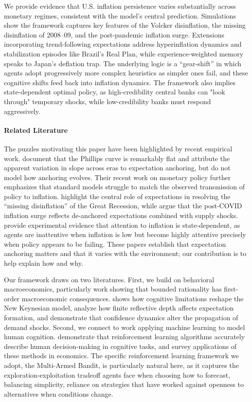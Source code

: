 \documentclass[10pt]{article}
\begin{document}
We provide evidence that U.S. inflation persistence varies substantially across monetary regimes, consistent with the model's central prediction. Simulations show the framework captures key features of the Volcker disinflation, the missing disinflation of 2008–09, and the post-pandemic inflation surge. Extensions incorporating trend-following expectations address hyperinflation dynamics and stabilization episodes like Brazil's Real Plan, while experience-weighted memory speaks to Japan's deflation trap. The underlying logic is a ``gear-shift'' in which agents adopt progressively more complex heuristics as simpler ones fail, and these cognitive shifts feed back into inflation dynamics. The framework also implies state-dependent optimal policy, as high-credibility central banks can "look through" temporary shocks, while low-credibility banks must respond aggressively.

\paragraph{Related Literature} The puzzles motivating this paper have been highlighted by recent empirical work. \citet{hazell2022slope} document that the Phillips curve is remarkably flat and attribute the apparent variation in slope across eras to expectation anchoring, but do not model how anchoring evolves. Their recent work on monetary policy \citep{nakamura2025taylor} further emphasizes that standard models struggle to match the observed transmission of policy to inflation. \citet{coibion2015} highlight the central role of expectations in resolving the ``missing disinflation'' of the Great Recession, while \citet{coibion2025inflation} argue that the post-COVID inflation surge reflects de-anchored expectations combined with supply shocks. \citet{weber2025} provide experimental evidence that attention to inflation is state-dependent, as agents are inattentive when inflation is low but become highly attentive precisely when policy appears to be failing. These papers establish that expectation anchoring matters and that it varies with the environment; our contribution is to help explain how and why.

Our framework draws on two literatures. First, we build on behavioral macroeconomics, particularly work showing that bounded rationality has first-order macroeconomic consequences. \citet{gabaix2020} shows how cognitive limitations reshape the New Keynesian model, \citet{garciaschmidt2019} analyze how finite reflective depth affects expectation formation, and \citet{angeletos2023confidence} demonstrate that confidence dynamics alter the propagation of demand shocks. Second, we connect to work applying machine learning to model human cognition. \citet{binz2023} demonstrate that reinforcement learning algorithms accurately describe human decision-making in cognitive tasks, and \citet{charpentier2021} survey applications of these methods in economics. The specific reinforcement learning framework we adopt, the Multi-Armed Bandit, is particularly natural here, as it captures the exploration-exploitation tradeoff agents face when choosing how to forecast, balancing simplicity, reliance on strategies that have worked against openness to alternatives when conditions change.
\end{document}
